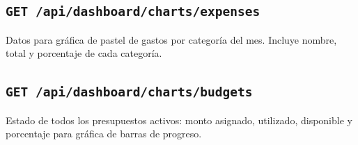 \subsection{\texttt{GET /api/dashboard/charts/expenses}}
Datos para gráfica de pastel de gastos por categoría del mes. Incluye nombre, total y porcentaje de cada categoría.

\subsection{\texttt{GET /api/dashboard/charts/budgets}}
Estado de todos los presupuestos activos: monto asignado, utilizado, disponible y porcentaje para gráfica de barras de progreso.
